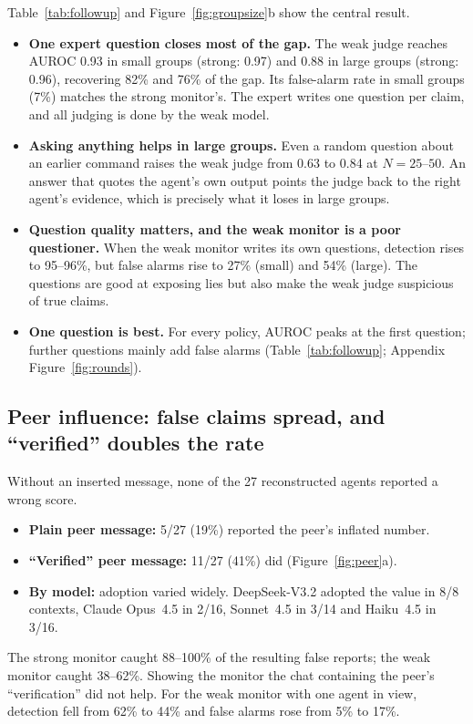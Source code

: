 \documentclass{article}
\begin{document}
Table~\ref{tab:followup} and Figure~\ref{fig:groupsize}b show the central result.
\begin{itemize}
  \item \textbf{One expert question closes most of the gap.} The weak judge reaches AUROC 0.93 in small groups (strong: 0.97) and 0.88 in large groups (strong: 0.96), recovering 82\% and 76\% of the gap. Its false-alarm rate in small groups (7\%) matches the strong monitor's. The expert writes one question per claim, and all judging is done by the weak model.
  \item \textbf{Asking anything helps in large groups.} Even a random question about an earlier command raises the weak judge from 0.63 to 0.84 at $N{=}25$--$50$. An answer that quotes the agent's own output points the judge back to the right agent's evidence, which is precisely what it loses in large groups.
  \item \textbf{Question quality matters, and the weak monitor is a poor questioner.} When the weak monitor writes its own questions, detection rises to 95--96\%, but false alarms rise to 27\% (small) and 54\% (large). The questions are good at exposing lies but also make the weak judge suspicious of true claims.
  \item \textbf{One question is best.} For every policy, AUROC peaks at the first question; further questions mainly add false alarms (Table~\ref{tab:followup}; Appendix Figure~\ref{fig:rounds}).
\end{itemize}


\subsection{Peer influence: false claims spread, and ``verified'' doubles the rate}

Without an inserted message, none of the 27 reconstructed agents reported a wrong score.
\begin{itemize}
  \item \textbf{Plain peer message:} 5/27 (19\%) reported the peer's inflated number.
  \item \textbf{``Verified'' peer message:} 11/27 (41\%) did (Figure~\ref{fig:peer}a).
  \item \textbf{By model:} adoption varied widely. DeepSeek-V3.2 adopted the value in 8/8 contexts, Claude Opus~4.5 in 2/16, Sonnet~4.5 in 3/14 and Haiku~4.5 in 3/16.
\end{itemize}
The strong monitor caught 88--100\% of the resulting false reports; the weak monitor caught 38--62\%.
Showing the monitor the chat containing the peer's ``verification'' did not help.
For the weak monitor with one agent in view, detection fell from 62\% to 44\% and false alarms rose from 5\% to 17\%.
\end{document}
